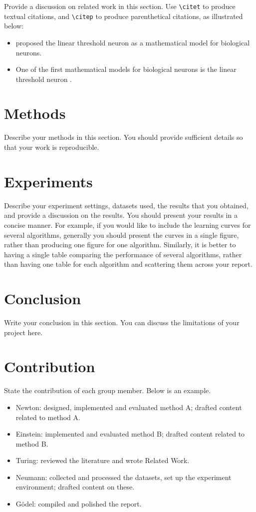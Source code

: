 \documentclass[a4paper,11pt]{article} %
\begin{document}
Provide a discussion on related work in this section.
Use \verb+\citet+ to produce textual citations, and \verb+\citep+ to produce
parenthetical citations, as illustrated below:
\begin{itemize}
	\item \citet{mcculloch1943logical} proposed the linear threshold neuron as a
		mathematical model for biological neurons.
	\item One of the first mathematical models for biological neurons is the linear
		threshold neuron \citep{mcculloch1943logical}. 
\end{itemize}

\section{Methods}

Describe your methods in this section.
You should provide sufficient details so that your work is reproducible.

\section{Experiments}

Describe your experiment settings, datasets used, the results that you obtained,
and provide a discussion on the results. 
You should present your results in a concise manner.
For example, if you would like to include the learning curves for several
algorithms, generally you should present the curves in a single figure, rather
than producing one figure for one algorithm. 
Similarly, it is better to having a single table comparing the performance of
several algorithms, rather than having one table for each algorithm and
scattering them across your report.

\section{Conclusion}

Write your conclusion in this section.
You can discuss the limitations of your project here.

\section*{Contribution}

State the contribution of each group member.
Below is an example.
\begin{itemize}
	\item Newton: designed, implemented and evaluated method A; drafted content
		related to method A.
	\item Einstein: implemented and evaluated method B; drafted content related to
		method B.
	\item Turing: reviewed the literature and wrote Related Work.
	\item Neumann: collected and processed the datasets, set up the experiment
		environment; drafted content on these.
	\item G\"odel: compiled and polished the report.
\end{itemize}
\end{document}
